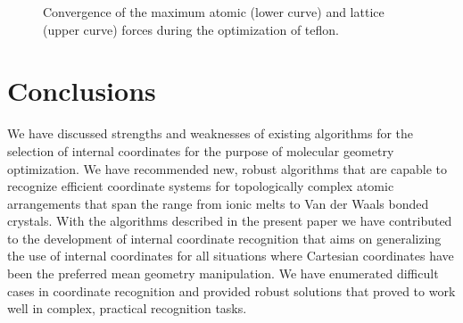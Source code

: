 \documentclass[prl,aps,preprint,superbib,12pt]{revtex4}
\begin{document}
\begin{figure}[h]
\caption{
Convergence of the maximum atomic (lower curve) 
and lattice (upper curve)
forces during the optimization of teflon.
\label{PETN}
}
\end{figure}

\section{Conclusions} \label{Conclusions}
We have discussed strengths and weaknesses of 
existing algorithms for the selection of 
internal coordinates for the purpose of molecular geometry optimization.
We have recommended new, robust algorithms that are capable
to recognize efficient coordinate systems for topologically
complex atomic arrangements that span the range from ionic melts to
Van der Waals bonded crystals. With the algorithms
described in the present paper we have contributed to the development 
of internal coordinate recognition that aims on generalizing the
use of internal coordinates for all situations 
where Cartesian coordinates have been the preferred mean
geometry manipulation. We have enumerated difficult cases 
in coordinate recognition and provided robust solutions that proved to
work well in complex, practical recognition tasks.


\end{document}
